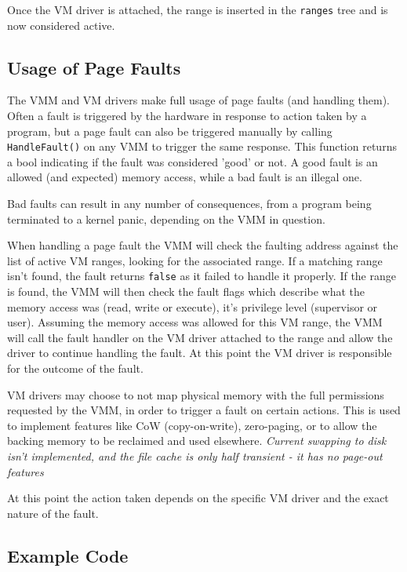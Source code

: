 Once the VM driver is attached, the range is inserted in the \verb|ranges| tree and is now considered active.

\subsection{Usage of Page Faults}
The VMM and VM drivers make full usage of page faults (and handling them). Often a fault is triggered by the hardware in response to action taken by a program, but a page fault can also be triggered manually by calling \verb|HandleFault()| on any VMM to trigger the same response. This function returns a bool indicating if the fault was considered 'good' or not. A good fault is an allowed (and expected) memory access, while a bad fault is an illegal one.

Bad faults can result in any number of consequences, from a program being terminated to a kernel panic, depending on the VMM in question.

When handling a page fault the VMM will check the faulting address against the list of active VM ranges, looking for the associated range. If a matching range isn't found, the fault returns \verb|false| as it failed to handle it properly. If the range is found, the VMM will then check the fault flags which describe what the memory access was (read, write or execute), it's privilege level (supervisor or user). Assuming the memory access was allowed for this VM range, the VMM will call the fault handler on the VM driver attached to the range and allow the driver to continue handling the fault. At this point the VM driver is responsible for the outcome of the fault.

VM drivers may choose to not map physical memory with the full permissions requested by the VMM, in order to trigger a fault on certain actions. This is used to implement features like CoW (copy-on-write), zero-paging, or to allow the backing memory to be reclaimed and used elsewhere. \textit{Current swapping to disk isn't implemented, and the file cache is only half transient - it has no page-out features}

At this point the action taken depends on the specific VM driver and the exact nature of the fault.

\subsection{Example Code}

